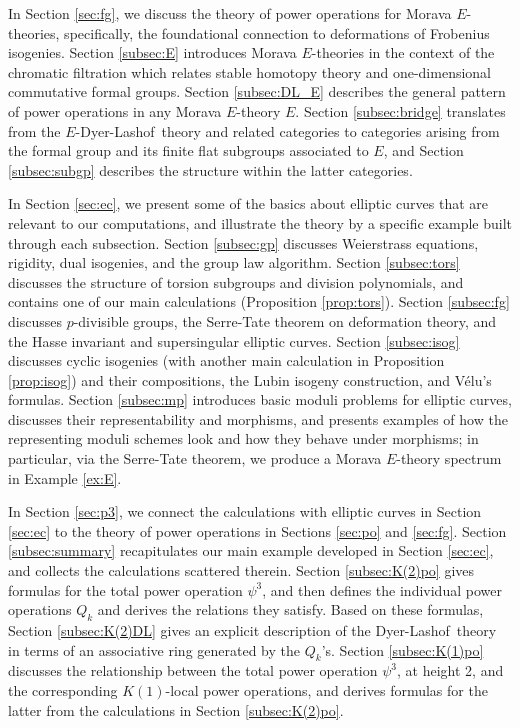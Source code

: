 \documentclass{gtpart}
\theoremstyle{definition}
\theoremstyle{remark}
\newcommand{\DL}{Dyer-Lashof~}
\newcommand{\p}{\psi^3}
\numberwithin{equation}{section}
\numberwithin{thm}{section}
\begin{document}
In Section \ref{sec:fg}, we discuss the theory of power operations for 
Morava $E$-theories, specifically, the foundational connection to 
deformations of Frobenius isogenies.  Section \ref{subsec:E} introduces 
Morava $E$-theories in the context of the chromatic filtration which 
relates stable homotopy theory and one-dimensional commutative formal 
groups.  Section \ref{subsec:DL_E} describes the general pattern of 
power operations in any Morava $E$-theory $E$.  Section 
\ref{subsec:bridge} translates from the $E$-\DL theory and related 
categories to categories arising from the formal group and its finite 
flat subgroups associated to $E$, and Section \ref{subsec:subgp} 
describes the structure within the latter categories.  

In Section \ref{sec:ec}, we present some of the basics about elliptic 
curves that are relevant to our computations, and illustrate the theory 
by a specific example built through each subsection.  Section 
\ref{subsec:gp} discusses Weierstrass equations, rigidity, dual 
isogenies, and the group law algorithm.  Section \ref{subsec:tors} 
discusses the structure of torsion subgroups and division polynomials, 
and contains one of our main calculations (Proposition \ref{prop:tors}).  
Section \ref{subsec:fg} discusses $p$-divisible groups, the Serre-Tate 
theorem on deformation theory, and the Hasse invariant and supersingular 
elliptic curves.  Section \ref{subsec:isog} discusses cyclic isogenies 
(with another main calculation in Proposition \ref{prop:isog}) and their 
compositions, the Lubin isogeny construction, and V\'elu's formulas.  
Section \ref{subsec:mp} introduces basic moduli problems for elliptic 
curves, discusses their representability and morphisms, and presents 
examples of how the representing moduli schemes look and how they behave 
under morphisms; in particular, via the Serre-Tate theorem, we produce a 
Morava $E$-theory spectrum in Example \ref{ex:E}.  

In Section \ref{sec:p3}, we connect the calculations with elliptic 
curves in Section \ref{sec:ec} to the theory of power operations in 
Sections \ref{sec:po} and \ref{sec:fg}.  Section \ref{subsec:summary} 
recapitulates our main example developed in Section \ref{sec:ec}, and 
collects the calculations scattered therein.  Section 
\ref{subsec:K(2)po} gives formulas for the total power operation $\p$, 
and then defines the individual power operations $Q_k$ and derives the 
relations they satisfy.  Based on these formulas, Section 
\ref{subsec:K(2)DL} gives an explicit description of the \DL theory in 
terms of an associative ring generated by the $Q_k$'s.  Section 
\ref{subsec:K(1)po} discusses the relationship between the total power 
operation $\p$, at height 2, and the corresponding $K(1)$-local power 
operations, and derives formulas for the latter from the calculations in 
Section \ref{subsec:K(2)po}.  
\end{document}
